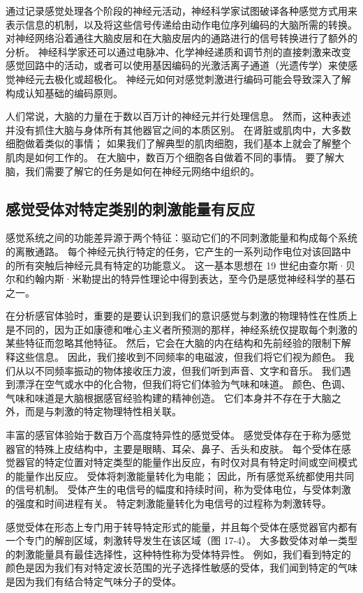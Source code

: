 通过记录感觉处理各个阶段的神经元活动，神经科学家试图破译各种感觉方式用来表示信息的机制，以及将这些信号传递给由动作电位序列编码的大脑所需的转换。 对神经网络沿着通往大脑皮层和在大脑皮层内的通路进行的信号转换进行了额外的分析。 神经科学家还可以通过电脉冲、化学神经递质和调节剂的直接刺激来改变感觉回路中的活动，或者可以使用基因编码的光激活离子通道（光遗传学）来使感觉神经元去极化或超极化。 神经元如何对感觉刺激进行编码可能会导致深入了解构成认知基础的编码原则。

人们常说，大脑的力量在于数以百万计的神经元并行处理信息。 然而，这种表述并没有抓住大脑与身体所有其他器官之间的本质区别。 在肾脏或肌肉中，大多数细胞做着类似的事情； 如果我们了解典型的肌肉细胞，我们基本上就会了解整个肌肉是如何工作的。 在大脑中，数百万个细胞各自做着不同的事情。 要了解大脑，我们需要了解它的任务是如何在神经元网络中组织的。


\subsection{感觉受体对特定类别的刺激能量有反应}

感觉系统之间的功能差异源于两个特征：驱动它们的不同刺激能量和构成每个系统的离散通路。 每个神经元执行特定的任务，它产生的一系列动作电位对该回路中的所有突触后神经元具有特定的功能意义。 这一基本思想在 19 世纪由查尔斯·贝尔和约翰内斯·米勒提出的特异性理论中得到表达，至今仍是感觉神经科学的基石之一。

在分析感官体验时，重要的是要认识到我们的意识感觉与刺激的物理特性在性质上是不同的，因为正如康德和唯心主义者所预测的那样，神经系统仅提取每个刺激的某些特征而忽略其他特征。 然后，它会在大脑的内在结构和先前经验的限制下解释这些信息。 因此，我们接收到不同频率的电磁波，但我们将它们视为颜色。 我们从以不同频率振动的物体接收压力波，但我们听到声音、文字和音乐。 我们遇到漂浮在空气或水中的化合物，但我们将它们体验为气味和味道。 颜色、色调、气味和味道是大脑根据感官经验构建的精神创造。 它们本身并不存在于大脑之外，而是与刺激的特定物理特性相关联。

丰富的感官体验始于数百万个高度特异性的感觉受体。 感觉受体存在于称为感觉器官的特殊上皮结构中，主要是眼睛、耳朵、鼻子、舌头和皮肤。 每个受体在感觉器官的特定位置对特定类型的能量作出反应，有时仅对具有特定时间或空间模式的能量作出反应。 受体将刺激能量转化为电能； 因此，所有感觉系统都使用共同的信号机制。 受体产生的电信号的幅度和持续时间，称为受体电位，与受体刺激的强度和时间进程有关。 特定刺激能量转化为电信号的过程称为刺激转导。

感觉受体在形态上专门用于转导特定形式的能量，并且每个受体在感觉器官内都有一个专门的解剖区域，刺激转导发生在该区域（图 17-4）。 大多数受体对单一类型的刺激能量具有最佳选择性，这种特性称为受体特异性。 例如，我们看到特定的颜色是因为我们有对特定波长范围的光子选择性敏感的受体，我们闻到特定的气味是因为我们有结合特定气味分子的受体。

